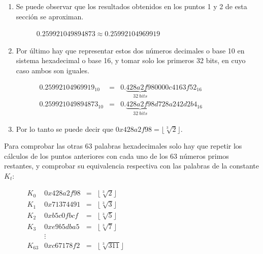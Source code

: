 \documentclass{article}
\begin{document}
\begin{enumerate}
            \item Se puede observar que los resultados obtenidos en los puntos 1 y 2 de esta sección se aproximan.
                \begin{figure}[H]
                \centering
                    $0.259921049894873 \approx 0.25992104969919$
                \end{figure}
            
            \item Por último hay que representar estos dos números decimales o base 10 en sistema hexadecimal o base 16, y tomar solo los primeros 32 bits, en cuyo caso ambos son iguales.
                \begin{figure}[H]
                \centering
                    $\begin{array}{lcl}
                    0.25992104969919_{10} & = & 0.\underbrace{428a2f98}_{32 \ bits}0000c4163f52_{16} \\
                    0.259921049894873_{10} & = & 0.\underbrace{428a2f98}_{32 \ bits}d728a242d2b4_{16}
                    \end{array}$
                \end{figure}
            
            \item Por lo tanto se puede decir que $0x428a2f98 = \lfloor \sqrt[3]{2} \rfloor$.
        \end{enumerate}
        
        Para comprobar las otras 63 palabras hexadecimales solo hay que repetir los cálculos de los puntos anteriores con cada uno de los 63 números primos restantes, y comprobar su equivalencia respectiva con las palabras de la constante $K_{t}$:
            \begin{figure}[H]
            \centering
                $\begin{array}{lccl}
                    K_{0} & 0x428a2f98 & = & \lfloor \sqrt[3]{2} \rfloor \\
                    K_{1} & 0x71374491 & = & \lfloor \sqrt[3]{3} \rfloor \\
                    K_{2} & 0xb5c0fbcf & = & \lfloor \sqrt[3]{5} \rfloor \\
                    K_{3} & 0xe9b5dba5 & = & \lfloor \sqrt[3]{7} \rfloor \\
                    & \vdots & \\
                    K_{63} & 0xc67178f2 & = & \lfloor \sqrt[3]{311} \rfloor
                \end{array}$
            \end{figure}
\end{document}
